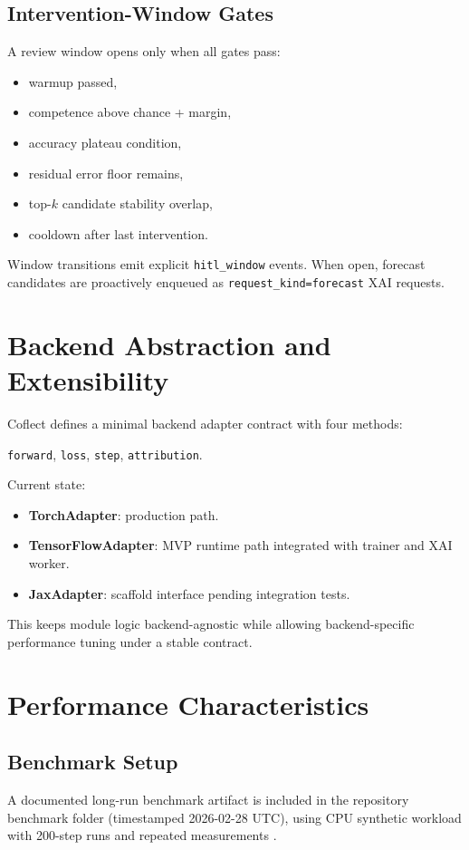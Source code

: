 \documentclass[11pt]{article}
\begin{document}
\subsection{Intervention-Window Gates}
A review window opens only when all gates pass:
\begin{itemize}[leftmargin=1.5em]
  \item warmup passed,
  \item competence above chance + margin,
  \item accuracy plateau condition,
  \item residual error floor remains,
  \item top-$k$ candidate stability overlap,
  \item cooldown after last intervention.
\end{itemize}

Window transitions emit explicit \texttt{hitl\_window} events.
When open, forecast candidates are proactively enqueued as \texttt{request\_kind=forecast} XAI requests.

\section{Backend Abstraction and Extensibility}
Coflect defines a minimal backend adapter contract with four methods:
\begin{center}
\texttt{forward}, \texttt{loss}, \texttt{step}, \texttt{attribution}.
\end{center}

Current state:
\begin{itemize}[leftmargin=1.5em]
  \item \textbf{TorchAdapter}: production path.
  \item \textbf{TensorFlowAdapter}: MVP runtime path integrated with trainer and XAI worker.
  \item \textbf{JaxAdapter}: scaffold interface pending integration tests.
\end{itemize}

This keeps module logic backend-agnostic while allowing backend-specific performance tuning under a stable contract.

\section{Performance Characteristics}
\subsection{Benchmark Setup}
A documented long-run benchmark artifact is included in the repository benchmark folder (timestamped 2026-02-28 UTC), using CPU synthetic workload with 200-step runs and repeated measurements \cite{coflectbenchmark2026}.
\end{document}
